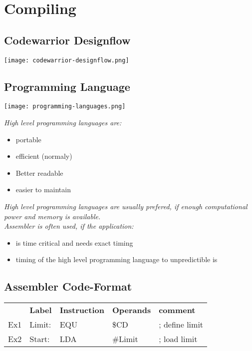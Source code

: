 \section{Compiling}

\subsection{Codewarrior Designflow}

\texttt{[image: codewarrior-designflow.png]}

\subsection{Programming Language}

\texttt{[image: programming-languages.png]}

\textit{High level programming languages are:}

\begin{itemize}
    \item{portable}
    \item{efficient (normaly)}
    \item{Better readable}
    \item{easier to maintain}
\end{itemize}

\textit{
    High level programming languages are usually prefered,
    if enough computational power and memory is available.
}
\\
\textit{
    Assembler is often used, if the application:
}
\begin{itemize}
    \item{is time critical and needs exact timing}
    \item{timing of the high level programming language to unpredictible is}
\end{itemize}

\subsection{Assembler Code-Format}

\begin{tabular}{rllll}
        & \textbf{Label}  & \textbf{Instruction}  & \textbf{Operands} & \textbf{comment} \\
    Ex1 & Limit: & EQU          & \$CD       & ; define limit \\
    Ex2 & Start: & LDA          & \#Limit     & ; load limit \\
\end{tabular}

